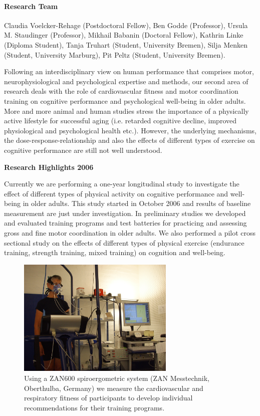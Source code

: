 

\paragraph{Research Team}
Claudia Voelcker-Rehage (Postdoctoral Fellow), Ben Godde (Professor), Ursula M. Staudinger (Professor), Mikhail Babanin (Doctoral Fellow), Kathrin Linke (Diploma Student), Tanja Truhart (Student, University Bremen), Silja Menken (Student, University Marburg), Pit Peltz (Student, University Bremen).

Following an interdisciplinary view on human performance that comprises motor, neurophysiological and psychological expertise and methods, our second area of research deals with the role of cardiovascular fitness and motor coordination training on cognitive performance and psychological well-being in older adults. More and more animal and human studies stress the importance of a physically active lifestyle for successful aging (i.e. retarded cognitive decline, improved physiological and psychological health etc.). However, the underlying mechanisms, the dose-response-relationship and also the effects of different types of exercise on cognitive performance are still not well understood.

\null
\textbf{Research Highlights 2006}

 Currently we are performing a one-year longitudinal study to investigate the effect of different types of physical activity on cognitive performance and well-being in older adults. 
\newpage 
This study started in October 2006 and results of baseline measurement are just under investigation. In preliminary studies we developed and evaluated training programs and test batteries for practicing and assessing gross and fine motor coordination in older adults. We also performed a pilot cross sectional study on the effects of different types of physical exercise (endurance training, strength training, mixed training) on cognition and well-being. 

\begin{figure}[h]
  \begin{center}
    \includegraphics[width=7.5cm]{profBenGodde-fig2.jpg}
    \caption{Using a ZAN600 spiroergometric system (ZAN Messtechnik, Oberthulba, Germany) we measure the cardiovascular and respiratory fitness of participants to develop individual recommendations for their training programs.}\label{fig2:profBenGodde}
   \end{center}
\end{figure}

